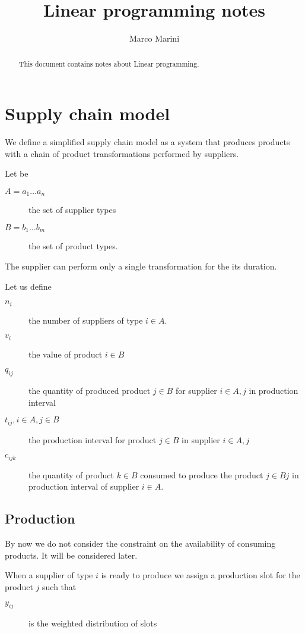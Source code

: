 \documentclass[a4paper,11pt]{article}
\title{Linear programming notes}
\author{Marco Marini}
\begin{document}
\maketitle
\tableofcontents

\begin{abstract}
This document contains notes about Linear programming.
\end{abstract}

\section{Supply chain model}

We define a simplified supply chain model as a system
that produces products with a chain of product transformations performed by suppliers.

Let be
\begin{description}
	\item [$ A = a_1 \dots a_n $]
		the set of supplier types
	\item [$ B = b_1 \dots b_m $]
		the set of product types.
\end{description}

The supplier can perform only a single transformation for the its duration.

Let us define
\begin{description}
	\item [$ n_i $]
		the number of suppliers of type $ i \in A $.
	\item[ $ v_{i} $ ]
	the value of product $ i \in B $
	\item[ $ q_{ij} $ ]
		the quantity of produced product $ j \in B  $ for supplier $ i \in A, j $ in production interval
	\item[ $ t_{ij}, i \in A, j \in B $ ]
		the production interval for product $ j \in B  $ in supplier $ i \in A, j $
	\item[$ c_{ijk} $ ]
		the quantity of product $ k \in B $ consumed to produce the product $ j \in Bj $ in production interval of supplier $ i \in A $.
\end{description}

\subsection{Production}

By now we do not consider the constraint on the availability of consuming products. It will be considered later.

When a supplier of type $ i $ is ready to produce we assign a production slot for the product $ j $ such that
\begin{description}
	\item[ $ y_{ij} $ ] is the weighted distribution of slots
\end{description}
\end{document}

